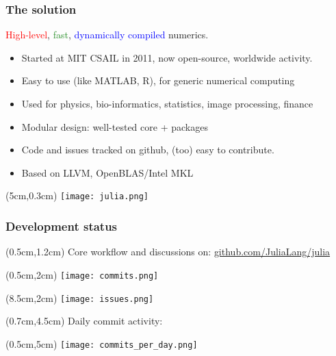 \documentclass[16pt]{beamer}
\begin{document}
\begin{frame}
  \frametitle{The solution}

  \vspace{.4cm}
  \begin{center}
  \Large{\textcolor{red}{High-level}, \textcolor{ForestGreen}{fast}, \textcolor{blue}{dynamically compiled} numerics.}
  \end{center}

  \begin{itemize}
  \item Started at MIT CSAIL in 2011, now open-source, worldwide activity.
  \item Easy to use (like MATLAB, R), for generic numerical computing
  \item Used for physics, bio-informatics, statistics, image processing, finance
  \item Modular design: well-tested core + packages
  \item Code and issues tracked on github, (too) easy to contribute.
  \item Based on LLVM, OpenBLAS/Intel MKL
  \end{itemize}

  \begin{textblock*}{5cm}(5cm,0.3cm) %
  \texttt{[image: julia.png]}
  \end{textblock*}

\end{frame}

\begin{frame}[fragile]
  \frametitle{Development status}
    \begin{textblock*}{10cm}(0.5cm,1.2cm)
    Core workflow and discussions on:
    \href{https://github.com/JuliaLang/julia/}{github.com/JuliaLang/julia}
    \end{textblock*}
  \begin{textblock*}{5cm}(0.5cm,2cm) %
    \texttt{[image: commits.png]}
  \end{textblock*}
  \begin{textblock*}{5cm}(8.5cm,2cm) %
    \texttt{[image: issues.png]}
  \end{textblock*}
  \begin{textblock*}{10cm}(0.7cm,4.5cm)
    Daily commit activity:
  \end{textblock*}
  \begin{textblock*}{5cm}(0.5cm,5cm) %
    \texttt{[image: commits\_per\_day.png]}
  \end{textblock*}
\end{frame}
\end{document}
